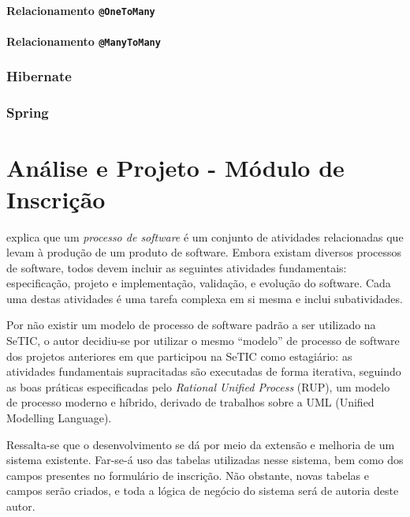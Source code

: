 \documentclass[
  10.5pt,				  %
	openright,			%
	twoside,			  %
  a5paper,
  chapter=TITLE,	%
	section=TITLE,	%
  hyphens,        %
	english,        %
	brazil          %
]{abntex2}
\begin{document}
\subsubsection{Relacionamento \texttt{@OneToMany}}




\subsubsection{Relacionamento \texttt{@ManyToMany}}


\subsection{Hibernate}

\subsection{Spring}



\chapter{Análise e Projeto - Módulo de Inscrição}

\cite{sommerville2011} explica que um \emph{processo de software} é um conjunto de atividades relacionadas que levam à produção de um produto de software. Embora existam diversos processos de software, todos devem incluir as seguintes atividades fundamentais: especificação, projeto e implementação, validação, e evolução do software. Cada uma destas atividades é uma tarefa complexa em si mesma e inclui subatividades.

Por não existir um modelo de processo de software padrão a ser utilizado na SeTIC, o autor decidiu-se por utilizar o mesmo ``modelo'' de processo de software dos projetos anteriores em que participou na SeTIC como estagiário: as atividades fundamentais supracitadas são executadas de forma iterativa, seguindo as boas práticas especificadas pelo \emph{Rational Unified Process} (RUP), um modelo de processo moderno e híbrido, derivado de trabalhos sobre a UML (Unified Modelling Language).

Ressalta-se que o desenvolvimento se dá por meio da extensão e melhoria de um sistema existente. Far-se-á uso das tabelas utilizadas nesse sistema, bem como dos campos presentes no formulário de inscrição. Não obstante, novas tabelas e campos serão criados, e toda a lógica de negócio do sistema será de autoria deste autor.
\end{document}
